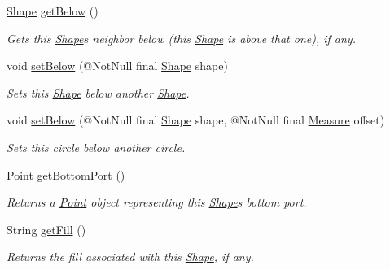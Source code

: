 \begin{DoxyCompactItemize}
\hyperlink{classcom_1_1aarrelaakso_1_1drawl_1_1_shape}{Shape} \hyperlink{classcom_1_1aarrelaakso_1_1drawl_1_1_shape_a53de5ab609d879719cd3b372dfe8df58}{get\+Below} ()
\begin{DoxyCompactList}\small\item\em Gets this \hyperlink{classcom_1_1aarrelaakso_1_1drawl_1_1_shape}{Shape}\textquotesingle{}s neighbor below (this \hyperlink{classcom_1_1aarrelaakso_1_1drawl_1_1_shape}{Shape} is above that one), if any. \end{DoxyCompactList}\item 
void \hyperlink{classcom_1_1aarrelaakso_1_1drawl_1_1_shape_a4147526667449f5beb534d4404ba8f77}{set\+Below} (@Not\+Null final \hyperlink{classcom_1_1aarrelaakso_1_1drawl_1_1_shape}{Shape} shape)
\begin{DoxyCompactList}\small\item\em Sets this \hyperlink{classcom_1_1aarrelaakso_1_1drawl_1_1_shape}{Shape} below another \hyperlink{classcom_1_1aarrelaakso_1_1drawl_1_1_shape}{Shape}. \end{DoxyCompactList}\item 
void \hyperlink{classcom_1_1aarrelaakso_1_1drawl_1_1_shape_a63c902c4e79235901744c6d83544fa54}{set\+Below} (@Not\+Null final \hyperlink{classcom_1_1aarrelaakso_1_1drawl_1_1_shape}{Shape} shape, @Not\+Null final \hyperlink{classcom_1_1aarrelaakso_1_1drawl_1_1_measure}{Measure} offset)
\begin{DoxyCompactList}\small\item\em Sets this circle below another circle. \end{DoxyCompactList}\item 
\hyperlink{classcom_1_1aarrelaakso_1_1drawl_1_1_point}{Point} \hyperlink{classcom_1_1aarrelaakso_1_1drawl_1_1_shape_aba14efe9a16c0808580963c66b171082}{get\+Bottom\+Port} ()
\begin{DoxyCompactList}\small\item\em Returns a \hyperlink{classcom_1_1aarrelaakso_1_1drawl_1_1_point}{Point} object representing this \hyperlink{classcom_1_1aarrelaakso_1_1drawl_1_1_shape}{Shape}\textquotesingle{}s bottom port. \end{DoxyCompactList}\item 
String \hyperlink{classcom_1_1aarrelaakso_1_1drawl_1_1_shape_a0d9a33a3e151aaceeec140bea343a650}{get\+Fill} ()
\begin{DoxyCompactList}\small\item\em Returns the fill associated with this \hyperlink{classcom_1_1aarrelaakso_1_1drawl_1_1_shape}{Shape}, if any. \end{DoxyCompactList}\item 

\end{DoxyCompactItemize}
